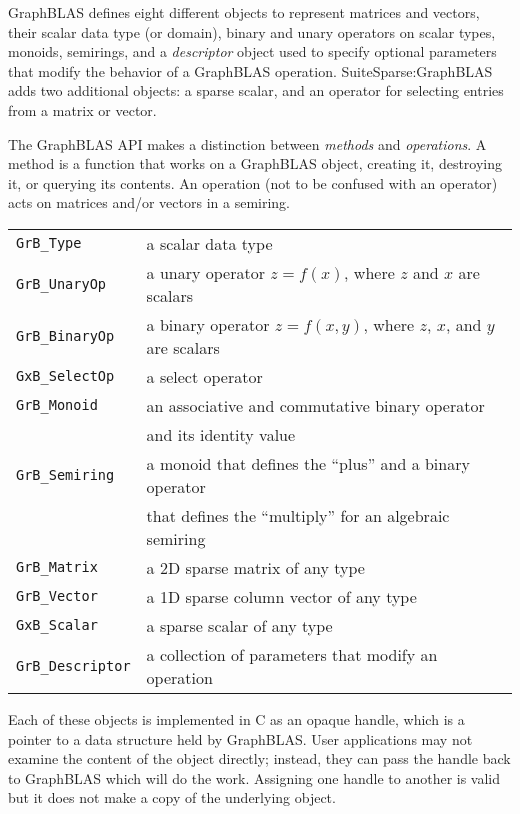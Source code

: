 \documentclass[12pt]{article}
\begin{document}
GraphBLAS defines eight different objects to represent matrices and vectors,
their scalar data type (or domain), binary and unary operators on scalar types,
monoids, semirings, and a {\em descriptor} object used to specify optional
parameters that modify the behavior of a GraphBLAS operation.
SuiteSparse:GraphBLAS adds two additional objects: a sparse scalar, and an
operator for selecting entries from a matrix or vector.

The GraphBLAS API makes a distinction between {\em methods} and {\em
operations}.  A method is a function that works on a GraphBLAS object, creating
it, destroying it, or querying its contents.  An operation (not to be confused
with an operator) acts on matrices and/or vectors in a semiring.

\vspace{0.1in}
\noindent
{\small
\begin{tabular}{ll}
\hline
\verb'GrB_Type'     & a scalar data type \\
\verb'GrB_UnaryOp'  & a unary operator $z=f(x)$,
                        where $z$ and $x$ are scalars\\
\verb'GrB_BinaryOp' & a binary operator $z=f(x,y)$,
                        where $z$, $x$, and $y$ are scalars\\
\verb'GxB_SelectOp' & a select operator \\
\verb'GrB_Monoid'   & an associative and commutative binary operator  \\
                    & and its identity value \\
\verb'GrB_Semiring' & a monoid that defines the ``plus'' and a binary operator\\
                    & that defines the ``multiply'' for an algebraic semiring \\
\verb'GrB_Matrix'   & a 2D sparse matrix of any type \\
\verb'GrB_Vector'   & a 1D sparse column vector of any type \\
\verb'GxB_Scalar'   & a sparse scalar of any type \\
\verb'GrB_Descriptor'& a collection of parameters that modify an operation \\
\hline
\end{tabular}
}
\vspace{0.1in}

Each of these objects is implemented in C as an opaque handle, which is a
pointer to a data structure held by GraphBLAS.  User applications may not
examine the content of the object directly; instead, they can pass the handle
back to GraphBLAS which will do the work.  Assigning one handle to another
is valid but it does not make a copy of the underlying object.
\end{document}
